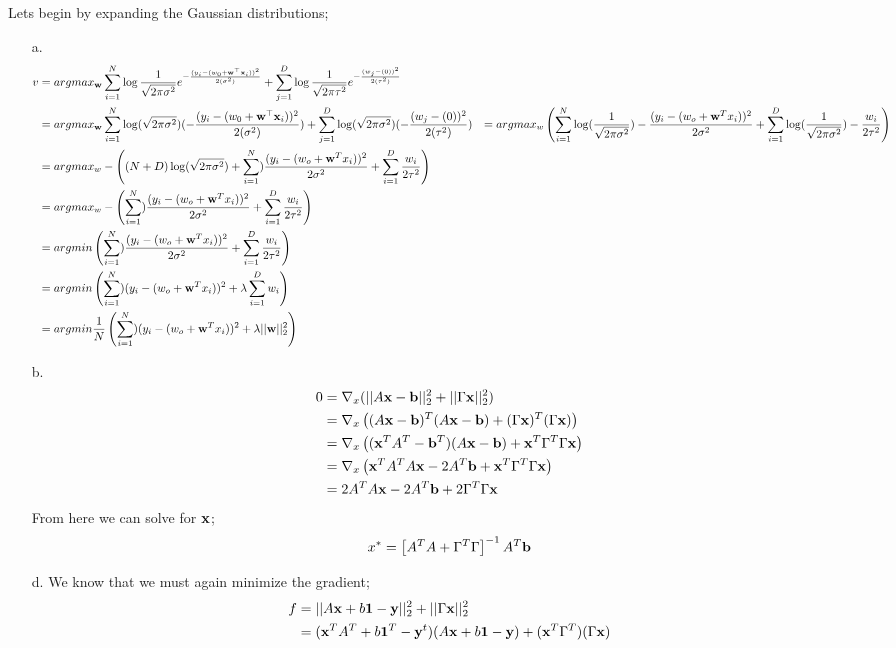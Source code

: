 \documentclass[12pt,letterpaper]{hmcpset}
\newcommand{\normdist}[3]{\frac{1}{\sqrt{2\pi #3}}e^{-\frac{(#1-(#2))^2}{2 (#3)}}}
\newcommand{\postlog}[3]{\log(\sqrt{2\pi \sigma^2})(-\frac{(#1-(#2))^2}{2 (#3)})}
\begin{document}
\begin{solution}
Lets begin by expanding the Gaussian distributions;
\begin{enumerate}
\item[a.]
\begin{align*}
v&=argmax_\ww \sum_{i=1}^N\log\normdist{y_i}{w_0 + \ww^\T\xx_i}{ \sigma^2}
+\sum_{j=1}^D \log\normdist{w_j}{0}{\tau^2}\\
&=argmax_\ww \sum_{i=1}^N\postlog{y_i}{w_0 + \ww^\T\xx_i}{ \sigma^2}+\sum_{j=1}^D \postlog{w_j}{0}{\tau^2}
 &= argmax_w\left(\sum_{i=1}^{N} \log (\frac{1}{\sqrt{2\pi \sigma^2}}) -\frac{(y_i-(w_o+\ww^Tx_i))^2}{2\sigma^2}+\sum_{i=1}^{D}\log(\frac{1}{\sqrt{2\pi \sigma^2}})-\frac{w_i}{2\tau^2}\right)\\
&=argmax_w -\left((N+D) \log(\sqrt{2\pi \sigma^2})+\sum_{i=1}^{N})\frac{(y_i-(w_o+\ww^Tx_i))^2}{2\sigma^2}+\sum_{i=1}^{D}\frac{w_i}{2\tau^2}\right)\\
&=argmax_w -\left(\sum_{i=1}^{N})\frac{(y_i-(w_o+\ww^Tx_i))^2}{2\sigma^2}+\sum_{i=1}^{D}\frac{w_i}{2\tau^2}\right)\\
&=argmin \left(\sum_{i=1}^{N})\frac{(y_i-(w_o+\ww^Tx_i))^2}{2\sigma^2}+\sum_{i=1}^{D}\frac{w_i}{2\tau^2}\right)\\
&=argmin \left(\sum_{i=1}^{N})(y_i-(w_o+\ww^Tx_i))^2+\lambda\sum_{i=1}^{D}w_i \right)\\
&=argmin \frac{1}{N}\left(\sum_{i=1}^{N})(y_i-(w_o+\ww^Tx_i))^2+\lambda||\ww||_2^2 \right)
\end{align*}
\item[b.]
\begin{align*}
0 &= \nabla_x(||A{\bf x} - {\bf b}||_2^2 + ||\Gamma{\bf x}||_2^2)\\
&= \nabla_x \left( (A{\bf x} - {\bf b})^T(A{\bf x} - {\bf b})+ (\Gamma{\bf x})^T(\Gamma{\bf x})\right)\\
&=\nabla_x \left( ({\bf x}^TA^T-{\bf b}^T)(A{\bf x}-{\bf b})+{\bf x}^T\Gamma^T\Gamma {\bf x} \right)\\
&= \nabla_x\left({\bf x}^TA^TA{\bf x}-2A^T{\bf b}+{\bf x}^T\Gamma^T\Gamma {\bf x} \right)\\
&=2A^TA{\bf x}-2A^T{\bf b}+2\Gamma^T \Gamma {\bf x}\\
\end{align*}
From here we can solve for ${\bf x}$;
$$x^* = \left[A^T A+\Gamma^T \Gamma\right]^{-1}A^T{\bf b}$$
\item[d.] We know that we must again minimize the gradient; 
\begin{align*}
f&= ||A\xx + b\1 - \yy||_2^2 + ||\Gamma\xx||_2^2\\
&=  (\xx^T A^T +b\1^T-\yy^t)(A\xx + b\1 - \yy) +(\xx^T \Gamma ^T)(\Gamma\xx)\\

\end{align*}
\end{enumerate}
\end{solution}
\end{document}
